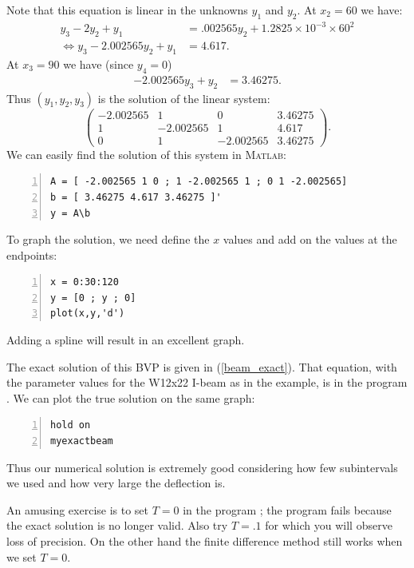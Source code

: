 Note that this equation is linear in the unknowns $y_1$ and $y_2$.
At $x_2 = 60$ we have:
\begin{equation}
  \begin{split}
    y_3 - 2 y_2 + y_1 
    &= .002565 y_2 + 1.2825 \times 10^{-3} \times 60^2\\
    \Leftrightarrow       y_3 - 2.002565 y_2 + y_1 & = 4.617.
  \end{split}
\end{equation}
At $x_3 = 90$ we have (since $y_4=0$)
\begin{equation}
  \begin{split} %
    - 2.002565 y_3 + y_2 &= 3.46275.
  \end{split}
\end{equation}
Thus $(y_1,y_2,y_3)$ is the solution of the linear system:
$$
\left( \begin{array}{ccc|c}
          -2.002565 & 1 & 0 & 3.46275 \\
          1 & -2.002565 & 1 & 4.617 \\
          0 & 1 & -2.002565 & 3.46275
       \end{array}
\right).
$$
We can easily find the solution of this system in \textsc{Matlab}:
\begin{lstlisting}[frame=none,numbers=left]
A = [ -2.002565 1 0 ; 1 -2.002565 1 ; 0 1 -2.002565]
b = [ 3.46275 4.617 3.46275 ]'
y = A\b
\end{lstlisting}
To graph the solution, we need
define the $x$ values and add on the values at the endpoints:
\begin{lstlisting}[frame=none,numbers=left]
x = 0:30:120
y = [0 ; y ; 0]
plot(x,y,'d')
\end{lstlisting}
Adding a spline will result in an excellent graph.

The exact solution of this BVP is given in (\ref{beam_exact}).
That equation, with the parameter values for the W12x22 I-beam
as in the example, is in the program .
We can plot the true solution on the same graph:
\begin{lstlisting}[frame=none,numbers=left]
hold on
myexactbeam
\end{lstlisting}
Thus our numerical solution is extremely good considering how
few subintervals we used and how very large the deflection is.

An amusing exercise is to set $T=0$ in the program ;
the program fails because the exact solution is no longer valid. Also
try $T=.1$ for which you will observe loss of precision. On the other hand
the finite difference method still works when we set $T=0$.

